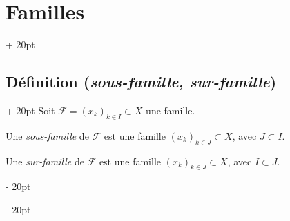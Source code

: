 \documentclass[a4paper, 12pt, twoside]{article}
\newcommand{\ind}[1][20pt]{\advance\leftskip + #1}
\newcommand{\deind}[1][20pt]{\advance\leftskip - #1}
\newenvironment{indt}[2][20pt]{#2 \par \ind[#1]}{\par \deind} %
\begin{document}
\begin{indt}{\section{Familles}}
        \vspace{12pt}
        
        \begin{indt}{\subsection{Définition (\textit{sous-famille, sur-famille})}}
            Soit $\mathcal F = (x_k)_{k \in I} \subset X$ une famille.
            
            \vspace{6pt}
            
            Une \textit{sous-famille} de $\mathcal F$ est une famille $(x_k)_{k \in J} \subset X$, avec $J \subset I$.
            
            Une \textit{sur-famille} de $\mathcal F$ est une famille $(x_k)_{k \in J} \subset X$, avec $I \subset J$.
        \end{indt}
        
    \end{indt}
    
    \vspace{12pt}
    
\end{document}
